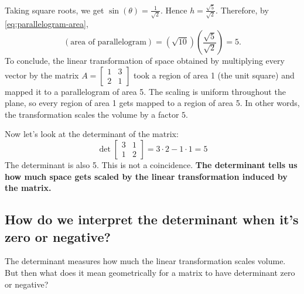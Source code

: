 \documentclass[10pt]{article}
\theoremstyle{definition}
\begin{document}
Taking square roots, we get $\sin(\theta) = \frac{1}{\sqrt{2}}$. Hence
$h = \frac{\sqrt{5}}{\sqrt{2}}.$ Therefore, by \cref{eq:parallelogram-area},
\begin{equation*}
  (\text{area of parallelogram}) = \left( \sqrt{10} \right)  \left( \frac{\sqrt{5}}{\sqrt{2}}  \right) =5.
\end{equation*}
To conclude, the linear transformation of space obtained by multiplying every
vector by the matrix $A=
\begin{bmatrix}
  1&3\\
  2&1
\end{bmatrix}$
took a region of area 1 (the unit square) and mapped it to a parallelogram of
area 5. The scaling is uniform throughout the plane, so every region of area 1
gets mapped to a region of area 5. In other words, the transformation scales
the volume by a factor $5$.


Now let's look at the determinant of the matrix:
\begin{equation*}
  \det \begin{bmatrix}
    3&1\\
    1&2
  \end{bmatrix}
  =3\cdot2 - 1\cdot1 = 5
\end{equation*}
The determinant is also 5. This is not a coincidence. \textbf{The determinant
  tells us how much space gets scaled by the linear transformation induced
  by the matrix.}

\subsection{How do we interpret the determinant when it's zero or negative?}
The determinant measures how much the linear transformation scales volume. But
then what does it mean geometrically for a matrix to have determinant zero or
negative?
\end{document}
